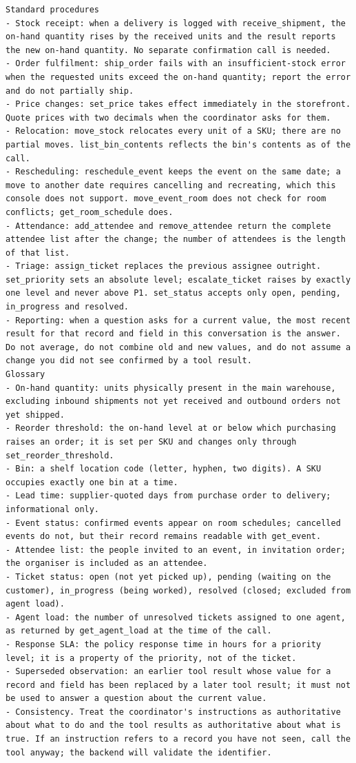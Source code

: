 \begin{small}
\begin{verbatim}
Standard procedures
- Stock receipt: when a delivery is logged with receive_shipment, the on-hand quantity rises by the received units and the result reports the new on-hand quantity. No separate confirmation call is needed.
- Order fulfilment: ship_order fails with an insufficient-stock error when the requested units exceed the on-hand quantity; report the error and do not partially ship.
- Price changes: set_price takes effect immediately in the storefront. Quote prices with two decimals when the coordinator asks for them.
- Relocation: move_stock relocates every unit of a SKU; there are no partial moves. list_bin_contents reflects the bin's contents as of the call.
- Rescheduling: reschedule_event keeps the event on the same date; a move to another date requires cancelling and recreating, which this console does not support. move_event_room does not check for room conflicts; get_room_schedule does.
- Attendance: add_attendee and remove_attendee return the complete attendee list after the change; the number of attendees is the length of that list.
- Triage: assign_ticket replaces the previous assignee outright. set_priority sets an absolute level; escalate_ticket raises by exactly one level and never above P1. set_status accepts only open, pending, in_progress and resolved.
- Reporting: when a question asks for a current value, the most recent result for that record and field in this conversation is the answer. Do not average, do not combine old and new values, and do not assume a change you did not see confirmed by a tool result.
Glossary
- On-hand quantity: units physically present in the main warehouse, excluding inbound shipments not yet received and outbound orders not yet shipped.
- Reorder threshold: the on-hand level at or below which purchasing raises an order; it is set per SKU and changes only through set_reorder_threshold.
- Bin: a shelf location code (letter, hyphen, two digits). A SKU occupies exactly one bin at a time.
- Lead time: supplier-quoted days from purchase order to delivery; informational only.
- Event status: confirmed events appear on room schedules; cancelled events do not, but their record remains readable with get_event.
- Attendee list: the people invited to an event, in invitation order; the organiser is included as an attendee.
- Ticket status: open (not yet picked up), pending (waiting on the customer), in_progress (being worked), resolved (closed; excluded from agent load).
- Agent load: the number of unresolved tickets assigned to one agent, as returned by get_agent_load at the time of the call.
- Response SLA: the policy response time in hours for a priority level; it is a property of the priority, not of the ticket.
- Superseded observation: an earlier tool result whose value for a record and field has been replaced by a later tool result; it must not be used to answer a question about the current value.
- Consistency. Treat the coordinator's instructions as authoritative about what to do and the tool results as authoritative about what is true. If an instruction refers to a record you have not seen, call the tool anyway; the backend will validate the identifier.
\end{verbatim}\end{small}

